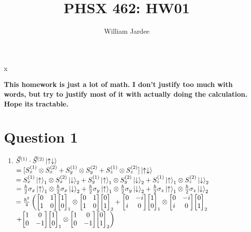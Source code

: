 x\documentclass[12pt]{article}
\begin{document}
\title{PHSX 462: HW01}
\author{William Jardee}
\maketitle

{\bf This homework is just a lot of math. I don't justify too much with words, but try to justify most of it with actually doing the calculation. Hope its tractable.}

\section*{Question 1}
\begin{enumerate}[label=\alph*)]
\item
\hspace*{1em}$\vec{S}^{(1)} \cdot \vec{S}^{(2)} \ket{\uparrow \downarrow}$\vspace{0.5em}\\
$=[S_x^{(1)}\otimes S_x^{(2)} + S_y^{(1)}\otimes S_y^{(2)} + S_z^{(1)}\otimes S_z^{(2)}]\ket{\uparrow \downarrow}$\vspace{0.5em}\\
$=S_x^{(1)}\ket{\uparrow}_1\otimes S_x^{(2)}\ket{\downarrow}_2 + S_y^{(1)}\ket{\uparrow}_1\otimes S_y^{(2)}\ket{\downarrow}_2 + S_z^{(1)}\ket{\uparrow}_1\otimes S_z^{(2)}\ket{\downarrow}_2$\vspace{0.5em}\\
$=\frac{\hbar}{2}\sigma_x\ket{\uparrow}_1\otimes \frac{\hbar}{2}\sigma_x\ket{\downarrow}_2 + \frac{\hbar}{2}\sigma_y\ket{\uparrow}_1\otimes \frac{\hbar}{2}\sigma_y\ket{\downarrow}_2 + \frac{\hbar}{2}\sigma_z\ket{\uparrow}_1\otimes \frac{\hbar}{2}\sigma_z\ket{\downarrow}_2$\vspace{0.5em}\\
$=\frac{\hbar^2}{4}\left(\mqty[0 & 1 \\ 1 & 0]\mqty[1\\0]_1\otimes\mqty[0&1 \\1 & 0]\mqty[0\\1]_2 + \mqty[0 & -i \\ i & 0]\mqty[1\\0]_1\otimes\mqty[0& -i \\ i &0]\mqty[0\\1]_2 \right.$\vspace{0.5em}\\
\hspace*{5em}$\left. + \mqty[1 &0\\0 &-1]\mqty[1\\0]_1\otimes\mqty[1 & 0 \\ 0 & -1]\mqty[0\\1]_2\right)$\vspace{0.5em}\\

\end{enumerate}
\end{document}
